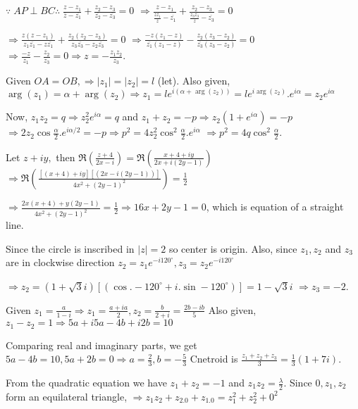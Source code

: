   $\because\;AP\perp BC \therefore\;\frac{z - z_1}{\overline{z} - \overline{z_1}} + \frac{z_2 - z_3}{\overline{z_2} -
    \overline{z_3}} = 0$
  $\Rightarrow \frac{z - z_1}{\frac{z\overline{z_1}}{z} - \overline{z_1}} + \frac{z_2 - z_3}{\frac{z_3\overline{z_3}}{z} -
    \overline{z_3}} = 0$

  $\Rightarrow \frac{z(z - z_1)}{z_1\overline{z_1} - z\overline{z_1}} + \frac{z_2(z_2 - z_3)}{z_3\overline{z_3} -
    z_2\overline{z_3}} = 0$
  $\Rightarrow \frac{-z(z_1 - z)}{\overline{z_1}(z_1 - z)} - \frac{z_2(z_3 - z_2)}{\overline{z_3}(z_3 - z_2)} = 0$
  $\Rightarrow \frac{-z}{z_1} - \frac{z_2}{z_3} = 0 \Rightarrow z = -\frac{z_1z_2}{z_3}$.
\item Given $OA = OB, \Rightarrow |z_1| = |z_2| = l$ (let).
  Also given, $\arg(z_1) = \alpha + \arg(z_2) \Rightarrow z_1 = le^{i(\alpha + \arg(z_2))} = le^{i\arg(z_2)}.e^{i\alpha} =
  z_2e^{i\alpha}$

  Now, $z_1z_2 = q \Rightarrow z_2^2e^{i\alpha} = q$ and $z_1 + z_2 = -p \Rightarrow z_2(1 + e^{i\alpha}) = -p$
  $\Rightarrow 2z_2\cos\frac{\alpha}{2}.e^{i\alpha/2} = -p \Rightarrow p^2 = 4z_2^2\cos^2\frac{\alpha}{2}.e^{i\alpha}$
  $\Rightarrow p^2 = 4q\cos^2\frac{\alpha}{2}$.
\item Let $z + iy,$ then $\Re\left(\frac{z + 4}{2x - i}\right) = \Re\left(\frac{x + 4 + iy}{2x + i(2y - 1)}\right)$
  $\Rightarrow \Re\left(\frac{[(x + 4) + iy][(2x - i(2y - 1))]}{4x^2 + (2y - 1)^2}\right) = \frac{1}{2}$

  $\Rightarrow \frac{2x(x + 4) + y(2y - 1)}{4x^2 + (2y - 1)^2} = \frac{1}{2} \Rightarrow 16x + 2y - 1= 0$,
  which is equation of a straight line.
\item Since the circle is inscribed in $|z| = 2$ so center is origin. Also, since $z_1, z_2$ and $z_3$ are in
  clockwise direction $z_2 = z_1e^{-i120^\circ}, z_3 = z_2e^{-i120^\circ}$

  $\Rightarrow z_2 = (1 + \sqrt{3}i)[(\cos. -120^\circ + i.\sin -120^\circ)] = 1-\sqrt{3}i$
  $\Rightarrow z_3 = -2$.
\item Given $z_1 = \frac{a}{1 - i} \Rightarrow z_1 = \frac{a + ia}{2}, z_2 = \frac{b}{2 + i} = \frac{2b - ib}{5}$
  Also given, $z_1 - z_2 = 1 \Rightarrow 5a + i5a - 4b + i2b = 10$

  Comparing real and imaginary parts, we get $5a - 4b = 10, 5a + 2b = 0 \Rightarrow a = \frac{2}{3}, b = -\frac{5}{3}$
  Cnetroid is $\frac{z_1 + z_2 + z_3}{3} = \frac{1}{3}(1 + 7i)$.
\item From the quadratic equation we have $z_1 + z_2 = -1$ and $z_1z_2 = \frac{\lambda}{2}$.
  Since $0, z_1, z_2$ form an equilateral triangle, $\Rightarrow z_1z_2 + z_2.0 + z_1.0 = z_1^2 + z_2^2 + 0^2$


